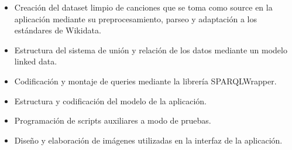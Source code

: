 \begin{itemize}

\item Creación del dataset limpio de canciones que se toma como source en la aplicación mediante su preprocesamiento, parseo y adaptación a los estándares de Wikidata.

\item Estructura del sistema de unión y relación de los datos mediante un modelo linked data.

\item Codificación y montaje de queries mediante la librería SPARQLWrapper.

\item Estructura y codificación del modelo de la aplicación.

\item Programación de scripts auxiliares a modo de pruebas.

\item Diseño y elaboración de imágenes utilizadas en la interfaz de la aplicación.

\end{itemize}
